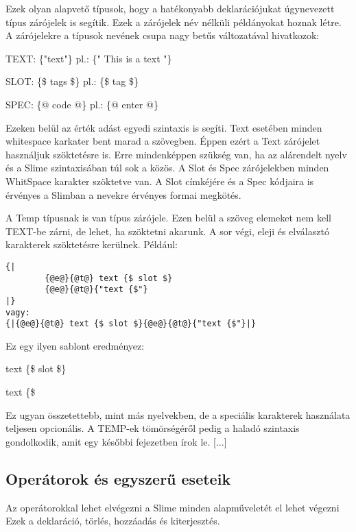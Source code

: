 Ezek olyan alapvető típusok, hogy a hatékonyabb deklarációjukat úgynevezett típus zárójelek is segítik. 
Ezek a zárójelek név nélküli példányokat hoznak létre.
A zárójelekre a típusok nevének csupa nagy betűs változatával hivatkozok:

TEXT: \{"text"\} pl.: \{" This is a text "\}

SLOT: \{\$ tags \$\} pl.: \{\$ tag \$\}

SPEC: \{@ code @\} pl.: \{@ enter @\}

Ezeken belül az érték adást egyedi szintaxis is segíti.
Text esetében minden whitespace karkater bent marad a szövegben.
Éppen ezért a Text zárójelet használjuk szöktetésre is.
Erre mindenképpen szükség van, ha az alárendelt nyelv és a Slime szintaxisában túl sok a közös.
A Slot és Spec zárójelekben minden WhitSpace karakter szöktetve van.
A Slot címkéjére és a Spec kódjaira is érvényes a Slimban a nevekre érvényes formai megkötés.

A Temp típusnak is van típus zárójele. 
Ezen belül a szöveg elemeket nem kell TEXT-be zárni, de lehet, ha szöktetni akarunk. 
A sor végi, eleji és elválasztó karakterek szöktetésre kerülnek. Például:\begin{verbatim}
{| 
		{@e@}{@t@} text {$ slot $} 
		{@e@}{@t@}{"text {$"}
|}
vagy:
{|{@e@}{@t@} text {$ slot $}{@e@}{@t@}{"text {$"}|}
\end{verbatim}Ez egy ilyen sablont eredményez:

		text \{\$ slot \$\}
		
		text \{\$ 
		
Ez ugyan összetettebb, mint más nyelvekben, de a speciális karakterek használata teljesen opcionális.
A TEMP-ek tömörségéről pedig a haladó szintaxis gondolkodik, amit egy későbbi fejezetben írok le. [...]


\subsection{Operátorok és egyszerű eseteik}
Az operátorokkal lehet elvégezni a Slime minden alapműveletét el lehet végezni
Ezek a deklaráció, törlés, hozzáadás és kiterjesztés. 

